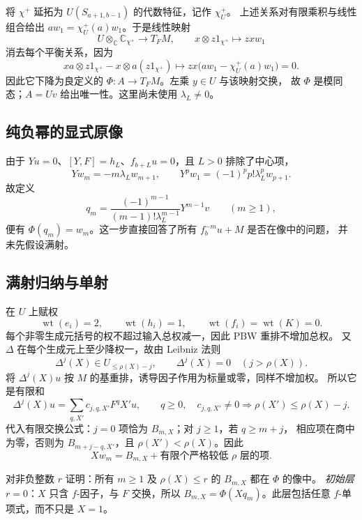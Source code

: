\documentclass[UTF8,11pt]{ctexart}
\newcommand{\C}{\mathbb C}
\newcommand{\wt}{\operatorname{wt}}
\theoremstyle{definition}
\begin{document}
将 \(\chi^+\) 延拓为 \(U(S_{a+1,b-1})\) 的代数特征，记作 \(\chi_U^+\)。
上述关系对有限乘积与线性组合给出 \(aw_1=\chi_U^+(a)w_1\)。于是线性映射
\[
 U\otimes_{\C}\C_{\chi^+}\longrightarrow T_FM,\qquad x\otimes z1_{\chi^+}\longmapsto zxw_1
\]
消去每个平衡关系，因为
\[
 xa\otimes z1_{\chi^+}-x\otimes a(z1_{\chi^+})
 \longmapsto zx\bigl(aw_1-\chi_U^+(a)w_1\bigr)=0.
\]
因此它下降为良定义的 \(\Phi:A\to T_FM\)。左乘 \(y\in U\) 与该映射交换，
故 \(\Phi\) 是模同态；\(A=Uv\) 给出唯一性。这里尚未使用 \(\lambda_L\ne0\)。

\subsection{纯负幂的显式原像}

由于 \(Yu=0\)、\([Y,F]=h_L\)、\(f_{b+L}u=0\)，且 \(L>0\) 排除了中心项，
\[
 Yw_m=-m\lambda_Lw_{m+1},\qquad
 Y^pw_1=(-1)^pp!\lambda_L^pw_{p+1}.
\]
故定义
\begin{equation}\label{eq:pure-preimage}
 q_m=\frac{(-1)^{m-1}}{(m-1)!\lambda_L^{m-1}}Y^{m-1}v
 \qquad(m\ge1),
\end{equation}
便有 \(\Phi(q_m)=w_m\)。这一步直接回答了所有 \(f_b^{-m}u+M\) 是否在像中的问题，
并未先假设满射。

\subsection{满射归纳与单射}

在 \(U\) 上赋权
\[
 \wt(e_i)=2,\qquad\wt(h_i)=1,\qquad\wt(f_i)=\wt(K)=0.
\]
每个非零生成元括号的权不超过输入总权减一，因此 PBW 重排不增加总权。
又 \(\Delta\) 在每个生成元上至少降权一，故由 Leibniz 法则
\[
 \Delta^j(X)\in U_{\le\rho(X)-j},\qquad \Delta^j(X)=0\quad(j>\rho(X)).
\]
将 \(\Delta^j(X)u\) 按 \(M\) 的基重排，诱导因子作用为标量或零，同样不增加权。
所以它是有限和
\[
 \Delta^j(X)u=\sum_{q,X'}c_{j,q,X'}F^qX'u,
 \qquad q\ge0,\quad c_{j,q,X'}\ne0\Longrightarrow\rho(X')\le\rho(X)-j.
\]
代入有限交换公式：\(j=0\) 项恰为 \(B_{m,X}\)；对 \(j\ge1\)，若 \(q\ge m+j\)，
相应项在商中为零，否则为 \(B_{m+j-q,X'}\)，且 \(\rho(X')<\rho(X)\)。因此
\begin{equation}\label{eq:triangular}
 Xw_m=B_{m,X}+\text{有限个严格较低 }\rho\text{ 层的项}.
\end{equation}

对非负整数 \(r\) 证明：所有 \(m\ge1\) 及 \(\rho(X)\le r\) 的 \(B_{m,X}\) 都在 \(\Phi\) 的像中。
\emph{初始层 \(r=0\)}：\(X\) 只含 \(f\)-因子，与 \(F\) 交换，所以
\(B_{m,X}=\Phi(Xq_m)\)。此层包括任意 \(f\)-单项式，而不只是 \(X=1\)。
\end{document}
